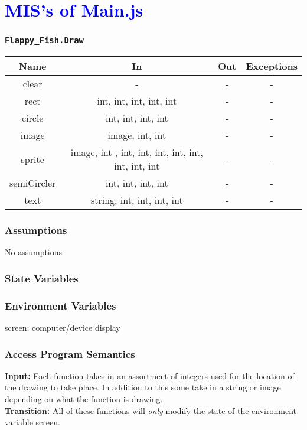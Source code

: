 \documentclass[11pt, oneside]{article}   	%
\begin{document}
\section{\textcolor{blue}{MIS's of Main.js}}
\subsubsection{\texttt{Flappy\_Fish.Draw}}



\begin{center}
\begin{tabular}{ |c|c|c|c| } 
 \hline
 Name & In & Out & Exceptions \\ 
 \hline \hline
 clear & - & - & - \\ 
 rect & int, int, int, int, int & - & - \\ 
 circle & int, int, int, int & - & - \\ 
 image & image, int, int & - & - \\ 
 sprite & image, int , int, int, int, int, int, int, int, int & - & - \\ 
 semiCircler & int, int, int, int & - & - \\ 
 text & string, int, int, int, int & - & - \\ 
 \hline
\end{tabular}
\end{center}

\subsubsection{Assumptions}
No assumptions

\subsubsection{State Variables}
\subsubsection{Environment Variables}
screen: computer/device display

\subsubsection{Access Program Semantics} 
 \textbf{Input:} Each function takes in an assortment of integers used for the location of the drawing to take place. In addition to this some take in a string or image depending on what the function is drawing.\\
 \textbf{Transition:} All of these functions will \textit{only} modify the state of the environment variable screen.
\end{document}
